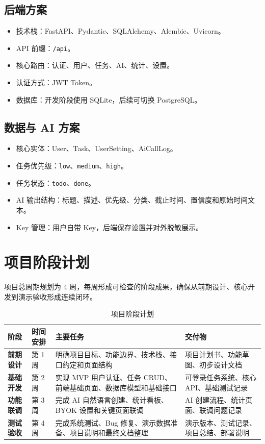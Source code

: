 \documentclass[UTF8,a4paper,12pt,fontset=fandol]{ctexart}
\newcommand{\code}[1]{{\small\texttt{#1}}}
\begin{document}
\subsection{后端方案}

\begin{itemize}
  \item 技术栈：FastAPI、Pydantic、SQLAlchemy、Alembic、Uvicorn。
  \item API 前缀：\code{/api}。
  \item 核心路由：认证、用户、任务、AI、统计、设置。
  \item 认证方式：JWT Token。
  \item 数据库：开发阶段使用 SQLite，后续可切换 PostgreSQL。
\end{itemize}

\subsection{数据与 AI 方案}

\begin{itemize}
  \item 核心实体：User、Task、UserSetting、AiCallLog。
  \item 任务优先级：\code{low}、\code{medium}、\code{high}。
  \item 任务状态：\code{todo}、\code{done}。
  \item AI 输出结构：标题、描述、优先级、分类、截止时间、置信度和原始时间文本。
  \item Key 管理：用户自带 Key，后端保存设置并对外脱敏展示。
\end{itemize}

\section{项目阶段计划}

项目总周期规划为 4 周，每周形成可检查的阶段成果，确保从前期设计、核心开发到演示验收形成连续闭环。

\begin{table}[H]
  \centering
  \caption{项目阶段计划}
  \begin{tabularx}{\linewidth}{>{\raggedright\arraybackslash\bfseries}p{2.4cm}>{\centering\arraybackslash}p{1.8cm}YY}
    \toprule
    阶段 & 时间安排 & 主要任务 & 交付物 \\
    \midrule
    前期设计 & 第 1 周 & 明确项目目标、功能边界、技术栈、接口约定和页面结构 & 项目计划书、功能草图、初步设计文档 \\
    基础开发 & 第 2 周 & 实现 MVP 用户认证、任务 CRUD、前端基础页面、数据库模型和基础接口 & 可登录任务系统、核心 API、基础测试记录 \\
    功能联调 & 第 3 周 & 完成 AI 自然语言创建、统计看板、BYOK 设置和关键页面联调 & AI 创建流程、统计页面、联调问题记录 \\
    测试验收 & 第 4 周 & 完成系统测试、Bug 修复、演示数据准备、项目说明和最终文档整理 & 演示版本、测试记录、项目总结、部署说明 \\
    \bottomrule
  \end{tabularx}
\end{table}
\end{document}
